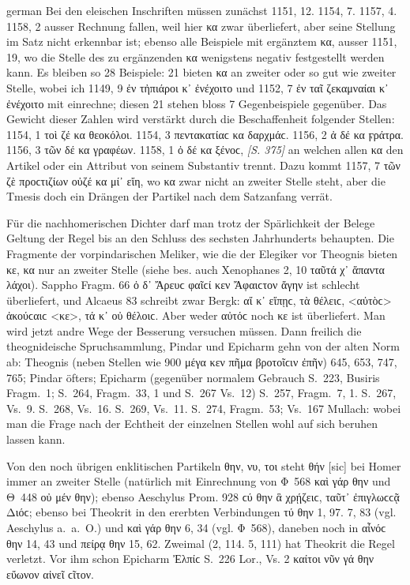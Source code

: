 \begin{otherlanguage*}{german}
Bei den eleischen Inschriften müssen zunächst 1151, 12. 1154, 7. 1157, 4. 1158, 2 ausser Rechnung fallen, weil hier κα zwar überliefert, aber seine Stellung im Satz nicht erkennbar ist; ebenso alle Beispiele mit ergänztem κα, ausser 1151, 19, wo die Stelle des zu ergänzenden κα wenigstens negativ festgestellt werden kann. Es bleiben so 28 Beispiele: 21 bieten κα an zweiter oder so gut wie zweiter Stelle, wobei ich 1149, 9 ἐν τἠπιάροι κ᾽ ἐνέχοιτο und 1152, 7 ἐν ταῖ ζεκαμναίαι κ᾽ ἐνέχοιτο mit einrechne; diesen 21 stehen bloss 7 Gegenbeispiele gegenüber. Das Gewicht dieser Zahlen wird verstärkt durch die Beschaffenheit folgender Stellen: 1154, 1 τοὶ ζέ κα θεοκόλοι. 1154, 3 πεντακατίαϲ κα δαρχμάϲ. 1156, 2 ἀ δέ κα ϝράτρα. 1156, 3 τῶν δέ κα γραφέων. 1158, 1 ὀ δέ κα ξένοϲ, \hypertarget{p375}{\emph{[S. 375]}}\label{p375} an welchen allen κα den Artikel oder ein Attribut von seinem Substantiv trennt. Dazu kommt 1157, 7 τῶν ζὲ προϲτιζίων οὐζέ κα μί᾽ εἴη, wo κα zwar nicht an zweiter Stelle steht, aber die Tmesis doch ein Drängen der Partikel nach dem Satzanfang verrät.

Für die nachhomerischen Dichter darf man trotz der Spärlichkeit der Belege Geltung der Regel bis an den Schluss des sechsten Jahrhunderts behaupten. Die Fragmente der vorpindarischen Meliker, wie die der Elegiker vor Theognis bieten κε, κα nur an zweiter Stelle (siehe bes. auch Xenophanes 2, 10 ταῦτά χ᾽ ἅπαντα λάχοι). Sappho Fragm. 66 ὀ δ᾽ Ἄρευϲ φαῖϲί κεν Ἄφαιϲτον ἄγην ist schlecht überliefert, und Alcaeus 83 schreibt zwar Bergk: αἴ κ᾽ εἴπῃϲ, τὰ θέλειϲ, <αὐτὸϲ> ἀκούϲαιϲ <κε>, τά κ᾽ οὐ θέλοιϲ. Aber weder αὐτόϲ noch κε ist überliefert. Man wird jetzt andre Wege der Besserung versuchen müssen. Dann freilich die theognideische Spruchsammlung, Pindar und Epicharm gehn von der alten Norm ab: Theognis (neben Stellen wie 900 μέγα κεν πῆμα βροτοῖϲιν ἐπῆν) 645, 653, 747, 765; Pindar öfters; Epicharm (gegenüber normalem Gebrauch S.~223, Busiris Fragm.~1; S.~264, Fragm.~33, 1 und S.~267 Vs.~12) S.~257, Fragm.~7, 1. S.~267, Vs.~9. S.~268, Vs.~16. S.~269, Vs.~11. S.~274, Fragm.~53; Vs.~167 Mullach: wobei man die Frage nach der Echtheit der einzelnen Stellen wohl auf sich beruhen lassen kann.

Von den noch übrigen enklitischen Partikeln θην, νυ, τοι steht θήν [sic] bei Homer immer an zweiter Stelle (natürlich mit Einrechnung von Φ~568 καὶ γάρ θην und Θ~448 οὐ μέν θην); ebenso Aeschylus Prom. 928 ϲύ θην ἃ χρῄζειϲ, ταῦτ᾽ ἐπιγλωϲϲᾷ Διόϲ; ebenso bei Theokrit in den ererbten Verbindungen τύ θην 1, 97. 7, 83 (vgl. Aeschylus a.~a.~O.) und καὶ γάρ θην 6, 34 (vgl. Φ~568), daneben noch in αἶνόϲ θην 14, 43 und πείρᾳ θην 15, 62. Zweimal (2, 114. 5, 111) hat Theokrit die Regel verletzt. Vor ihm schon Epicharm Ἐλπίϲ S.~226 Lor., Vs. 2 καίτοι νῦν γά θην εὔωνον αἰνεῖ ϲῖτον.


\end{otherlanguage*}

